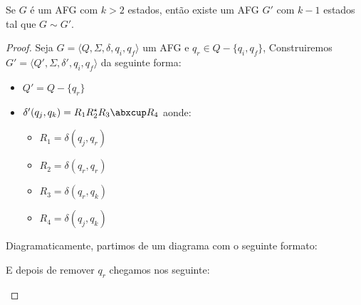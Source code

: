\begin{lemma}
Se $G$ é um AFG com $k > 2$ estados, então existe um AFG $G'$ com $k-1$ estados tal que $G \sim G'$.
\end{lemma}
\begin{proof}
  Seja $G = \langle Q, \Sigma, \delta, q_i, q_f \rangle$ um AFG e $q_r \in Q - \{q_i, q_f\}$,
Construiremos $G' = \langle Q', \Sigma, \delta', q_i, q_f \rangle$ da seguinte forma:

\begin{itemize}
\item[] $Q' = Q - \{q_r\}$
\item[] $\delta'(q_j, q_k) = R_1 R_2^\star R_3 \abxcup R_4$ aonde:
\begin{itemize}
\item[] $R_1 = \delta(q_j, q_r)$
\item[] $R_2 = \delta(q_r, q_r)$
\item[] $R_3 = \delta(q_r, q_k)$
\item[] $R_4 = \delta(q_j, q_k)$
\end{itemize}
\end{itemize}

Diagramaticamente, partimos de um diagrama com o seguinte formato:

\begin{center}
\end{center}

E depois de remover $q_r$ chegamos nos seguinte:

\begin{center}
\end{center}
\end{proof}



